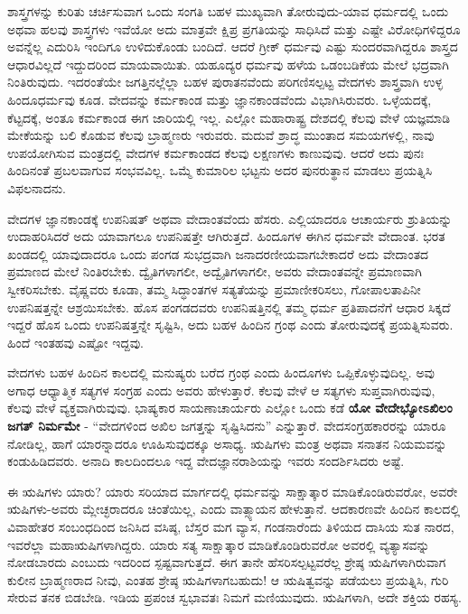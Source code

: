 ಶಾಸ್ತ್ರಗಳನ್ನು ಕುರಿತು ಚರ್ಚಿಸುವಾಗ ಒಂದು ಸಂಗತಿ ಬಹಳ ಮುಖ್ಯವಾಗಿ ತೋರುವುದು-ಯಾವ ಧರ್ಮದಲ್ಲಿ ಒಂದು ಅಥವಾ ಹಲವು ಶಾಸ್ತ್ರಗಳು ಇವೆಯೋ ಅದು ಮಾತ್ರವೇ ಕ್ಷಿಪ್ರ ಪ್ರಗತಿಯನ್ನು ಸಾಧಿಸಿದೆ ಮತ್ತು ಎಷ್ಟೇ ವಿರೋಧಿಗಳಿದ್ದರೂ ಅವನ್ನೆಲ್ಲ ಎದುರಿಸಿ ಇಂದಿಗೂ ಉಳಿದುಕೊಂಡು ಬಂದಿದೆ. ಆದರೆ ಗ್ರೀಕ್​ ಧರ್ಮವು ಎಷ್ಟು ಸುಂದರವಾಗಿದ್ದರೂ ಶಾಸ್ತ್ರದ ಆಧಾರವಿಲ್ಲದೆ ಇದ್ದುದರಿಂದ ಮಾಯವಾಯಿತು. ಯಹೂದ್ಯರ ಧರ್ಮವು ಹಳೆಯ ಒಡಂಬಡಿಕೆಯ ಮೇಲೆ ಭದ್ರವಾಗಿ ನಿಂತಿರುವುದು. ಇದರಂತೆಯೇ ಜಗತ್ತಿನಲ್ಲೆಲ್ಲಾ ಬಹಳ ಪುರಾತನವೆಂದು ಪರಿಗಣಿಸಲ್ಪಟ್ಟ ವೇದಗಳು ಶಾಸ್ತ್ರವಾಗಿ ಉಳ್ಳ ಹಿಂದೂಧರ್ಮವು ಕೂಡ. ವೇದವನ್ನು ಕರ್ಮಕಾಂಡ ಮತ್ತು ಜ್ಞಾನಕಾಂಡವೆಂದು ವಿಭಾಗಿಸಿರುವರು. ಒಳ್ಳೆಯದಕ್ಕೆ, ಕೆಟ್ಟದಕ್ಕೆ, ಅಂತೂ ಕರ್ಮಕಾಂಡ ಈಗ ಜಾರಿಯಲ್ಲಿ ಇಲ್ಲ. ಎಲ್ಲೋ ಮಹಾರಾಷ್ಟ್ರ ದೇಶದಲ್ಲಿ ಕೆಲವು ವೇಳೆ ಯಜ್ಞಮಾಡಿ ಮೇಕೆಯನ್ನು ಬಲಿ ಕೊಡುವ ಕೆಲವು ಬ್ರಾಹ್ಮಣರು ಇರುವರು. ಮದುವೆ ಶ್ರಾದ್ಧ ಮುಂತಾದ ಸಮಯಗಳಲ್ಲಿ, ನಾವು ಉಪಯೋಗಿಸುವ ಮಂತ್ರದಲ್ಲಿ ವೇದಗಳ ಕರ್ಮಕಾಂಡದ ಕೆಲವು ಲಕ್ಷಣಗಳು ಕಾಣುವುವು. ಆದರೆ ಅದು ಪುನಃ ಹಿಂದಿನಂತೆ ಪ್ರಬಲವಾಗುವ ಸಂಭವವಿಲ್ಲ. ಒಮ್ಮೆ ಕುಮಾರಿಲ ಭಟ್ಟನು ಅದರ ಪುನರುತ್ಥಾನ ಮಾಡಲು ಪ್ರಯತ್ನಿಸಿ ವಿಫಲನಾದನು.

ವೇದಗಳ ಜ್ಞಾನಕಾಂಡಕ್ಕೆ ಉಪನಿಷತ್​ ಅಥವಾ ವೇದಾಂತವೆಂದು ಹೆಸರು. ಎಲ್ಲಿಯಾದರೂ ಆಚಾರ್ಯರು ಶ್ರುತಿಯನ್ನು ಉದಾಹರಿಸಿದರೆ ಅದು ಯಾವಾಗಲೂ ಉಪನಿಷತ್ತೇ ಆಗಿರುತ್ತದೆ. ಹಿಂದೂಗಳ ಈಗಿನ ಧರ್ಮವೇ ವೇದಾಂತ. ಭರತ ಖಂಡದಲ್ಲಿ ಯಾವುದಾದರೂ ಒಂದು ಪಂಗಡ ಸುಭದ್ರವಾಗಿ ಜನಾದರಣೀಯವಾಗಬೇಕಾದರೆ ಅದು ವೇದಾಂತದ ಪ್ರಮಾಣದ ಮೇಲೆ ನಿಂತಿರಬೇಕು. ದ್ವೈತಿಗಳಾಗಲೀ, ಅದ್ವೈತಿಗಳಾಗಲೀ, ಅವರು ವೇದಾಂತವನ್ನೇ ಪ್ರಮಾಣವಾಗಿ ಸ್ವೀಕರಿಸಬೇಕು. ವೈಷ್ಣವರು ಕೂಡಾ, ತಮ್ಮ ಸಿದ್ಧಾಂತಗಳ ಸತ್ಯತೆಯನ್ನು ಪ್ರಮಾಣೀಕರಿಸಲು, ಗೋಪಾಲತಾಪಿನೀ ಉಪನಿಷತ್ತನ್ನೇ ಆಶ್ರಯಿಸಬೇಕು. ಹೊಸ ಪಂಗಡದವರು ಉಪನಿಷತ್ತಿನಲ್ಲಿ ತಮ್ಮ ಧರ್ಮ ಪ್ರತಿಪಾದನೆಗೆ ಆಧಾರ ಸಿಕ್ಕದೆ ಇದ್ದರೆ ಹೊಸ ಒಂದು ಉಪನಿಷತ್ತನ್ನೇ ಸೃಷ್ಟಿಸಿ, ಅದು ಬಹಳ ಹಿಂದಿನ ಗ್ರಂಥ ಎಂದು ತೋರುವುದಕ್ಕೆ ಪ್ರಯತ್ನಿಸುವರು. ಹಿಂದೆ ಇಂತಹವು ಎಷ್ಟೋ ಇದ್ದವು.

ವೇದಗಳು ಬಹಳ ಹಿಂದಿನ ಕಾಲದಲ್ಲಿ ಮನುಷ್ಯರು ಬರೆದ ಗ್ರಂಥ ಎಂದು ಹಿಂದೂಗಳು ಒಪ್ಪಿಕೊಳ್ಳುವುದಿಲ್ಲ. ಅವು ಅಗಾಧ ಆಧ್ಯಾತ್ಮಿಕ ಸತ್ಯಗಳ ಸಂಗ್ರಹ ಎಂದು ಅವರು ಹೇಳುತ್ತಾರೆ. ಕೆಲವು ವೇಳೆ ಆ ಸತ್ಯಗಳು ಸುಪ್ತವಾಗಿರುವುವು, ಕೆಲವು ವೇಳೆ ವ್ಯಕ್ತವಾಗಿರುವುವು. ಭಾಷ್ಯಕಾರ ಸಾಯಣಾಚಾರ್ಯರು ಎಲ್ಲೋ ಒಂದು ಕಡೆ \textbf{ಯೋ ವೇದೇಭ್ಯೋಽಖಿಲಂ ಜಗತ್​ ನಿರ್ಮಮೇ} - “ವೇದಗಳಿಂದ ಅಖಿಲ ಜಗತ್ತನ್ನು ಸೃಷ್ಟಿಸಿದನು” ಎನ್ನುತ್ತಾರೆ. ವೇದಸಂಗ್ರಹಕಾರರನ್ನು ಯಾರೂ ನೋಡಿಲ್ಲ, ಹಾಗೆ ಯಾರನ್ನಾದರೂ ಊಹಿಸುವುದಕ್ಕೂ ಅಸಾಧ್ಯ. ಋಷಿಗಳು ಮಂತ್ರ ಅಥವಾ ಸನಾತನ ನಿಯಮವನ್ನು ಕಂಡುಹಿಡಿದವರು. ಅನಾದಿ ಕಾಲದಿಂದಲೂ ಇದ್ದ ವೇದಜ್ಞಾನರಾಶಿಯನ್ನು ಇವರು ಸಂದರ್ಶಿಸಿದರು ಅಷ್ಟೆ.

ಈ ಋಷಿಗಳು ಯಾರು? ಯಾರು ಸರಿಯಾದ ಮಾರ್ಗದಲ್ಲಿ ಧರ್ಮವನ್ನು ಸಾಕ್ಷಾತ್ಕಾರ ಮಾಡಿಕೊಂಡಿರುವರೋ, ಅವರೇ ಋಷಿಗಳು-ಅವರು ಮ್ಲೇಚ್ಛರಾದರೂ ಚಿಂತೆಯಿಲ್ಲ, ಎಂದು ವಾತ್ಸ್ಯಾಯನ ಹೇಳುತ್ತಾನೆ. ಆದಕಾರಣವೇ ಹಿಂದಿನ ಕಾಲದಲ್ಲಿ ವಿವಾಹೇತರ ಸಂಬಂಧದಿಂದ ಜನಿಸಿದ ವಸಿಷ್ಠ, ಬೆಸ್ತರ ಮಗ ವ್ಯಾಸ, ಗಂಡನಾರೆಂದು ತಿಳಿಯದ ದಾಸಿಯ ಸುತ ನಾರದ, ಇವರೆಲ್ಲಾ ಮಹಾಋಷಿಗಳಾಗಿದ್ದರು. ಯಾರು ಸತ್ಯ ಸಾಕ್ಷಾತ್ಕಾರ ಮಾಡಿಕೊಂಡಿರುವರೋ ಅವರಲ್ಲಿ ವ್ಯತ್ಯಾಸವನ್ನು ನೋಡಬಾರದು ಎಂಬುದು ಇದರಿಂದ ಸ್ಪಷ್ಟವಾಗುತ್ತದೆ. ಈಗ ತಾನೇ ಹೆಸರಿಸಲ್ಪಟ್ಟವರೆಲ್ಲ ಶ್ರೇಷ್ಠ ಋಷಿಗಳಾಗಿರುವಾಗ ಕುಲೀನ ಬ್ರಾಹ್ಮಣರಾದ ನೀವು, ಎಂತಹ ಶ್ರೇಷ್ಠ ಋಷಿಗಳಾಗಬಹುದು! ಆ ಋಷಿತ್ವವನ್ನು ಪಡೆಯಲು ಪ್ರಯತ್ನಿಸಿ, ಗುರಿ ಸೇರುವ ತನಕ ಬಿಡಬೇಡಿ. ಇಡಿಯ ಪ್ರಪಂಚ ಸ್ವಭಾವತಃ ನಿಮಗೆ ಮಣಿಯುವುದು. ಋಷಿಗಳಾಗಿ, ಅದೇ ಶಕ್ತಿಯ ರಹಸ್ಯ.

